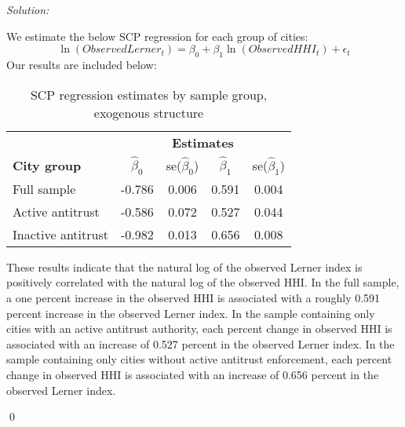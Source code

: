 \documentclass[12pt]{article}
\newenvironment{problem}[2][Problem]{\begin{trivlist}
\item[\hskip \labelsep {\bfseries #1}\hskip \labelsep {\bfseries #2.}]}{\end{trivlist}}
\newenvironment{sol}
    {\emph{Solution:}
    }
    {
    \qed
    }
\begin{document}
\begin{problem}{2}
\end{problem}
\begin{sol}
   We estimate the below SCP regression for each group of cities:
    \[\ln(ObservedLerner_t) = \beta_0 + \beta_1 \ln(ObservedHHI_t) + \epsilon_t\]
    Our results are included below:
    \begin{table}[!ht] %
      \centering %
      \begin{tabular}{l c c c c} %
      \toprule %
      & \multicolumn{4}{c}{\textbf{Estimates}} \\ %
      \cmidrule(l){2-5} %
      \textbf{City group} & $\hat{\beta}_0$ & se($\hat{\beta}_0$) & $\hat{\beta}_1$ & se($\hat{\beta}_1$)\\ %
      \midrule %
      Full sample & -0.786 & 0.006 & 0.591 & 0.004 \\ %
      Active antitrust & -0.586 & 0.072 & 0.527 & 0.044 \\ %
      Inactive antitrust & -0.982 & 0.013 & 0.656 & 0.008 \\ %
      \bottomrule %
      \end{tabular}
      \caption{SCP regression estimates by sample group, exogenous structure} %
      \label{tab:reg_table} %
      \end{table}
      These results indicate that the natural log of the observed Lerner index is positively correlated with the natural log of the observed HHI. In the full sample, a one percent increase in the observed HHI is associated with a roughly 0.591 percent increase in the observed Lerner index. In the sample containing only cities with an active antitrust authority, each percent change in observed HHI is associated with an increase of 0.527 percent in the observed Lerner index. In the sample containing only cities without active antitrust enforcement, each percent change in observed HHI is associated with an increase of 0.656 percent in the observed Lerner index. 


\end{sol}
\end{document}
